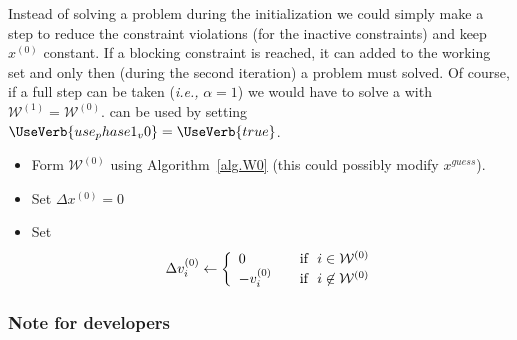 \documentclass[12pt,a4paper]{article}
\begin{document}
Instead of solving a  problem during the initialization we could simply make a step
to reduce the constraint violations (for the inactive constraints) and keep $x^{(0)}$ constant. If a
blocking constraint is reached, it can added to the working set and only then (during the second
iteration) a  problem must solved. Of course, if a full step can be taken
(\emph{i.e.,} $\alpha = 1$) we would have to solve a  with $\mathcal{W}^{(1)} =
\mathcal{W}^{(0)}$.  can be used by setting {\color{blue}$\UseVerb{use_phase1_v0}
  = \UseVerb{true}$}.
%
\begin{itemize}
\item Form $\mathcal{W}^{(0)}$ using Algorithm~\ref{alg.W0} (this could possibly modify $x^{\mathit{guess}}$).

\item Set $\Delta x^{(0)} = 0$

\item Set
  \begin{align*}
    \Delta v_i^{(0)} \leftarrow \left\{ 
    \begin{array}{l l}
      0 & \quad \text{if} \,\,\,\, i\in\mathcal{W}^{(0)} \\
      -v_i^{(0)} & \quad \text{if} \,\,\,\, i\not\in\mathcal{W}^{(0)}
    \end{array} \right.
  \end{align*}
\end{itemize}

\subsubsection{Note for developers}
\end{document}
